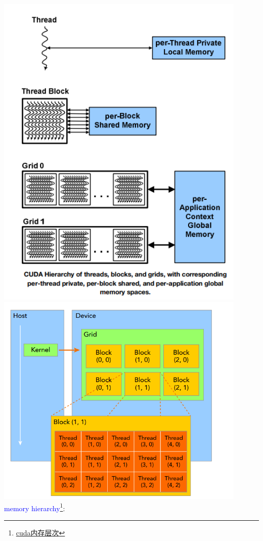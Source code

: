 \includegraphics[width=0.9\textwidth]{assets/thread.png}\\
\includegraphics[width=0.9\textwidth]{assets/thread2.png}\\
\textcolor{blue}{memory hierarchy}\footnote{\href{https://blog.csdn.net/xukang95/article/details/102855750}{cuda内存层次}}:\\
